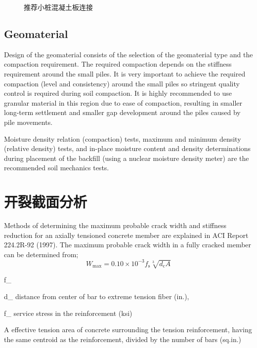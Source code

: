 \begin{figure}
  \caption{推荐小桩混凝土板连接}
  \label{fig:pile-slab-connection}
\end{figure}

\subsection{Geomaterial}

Design of the geomaterial consists of the selection of the geomaterial type and the compaction requirement. The required compaction depends on the stiffness requirement around the small piles. It is very important to achieve the required compaction (level and consistency) around the small piles so stringent quality control is required during soil compaction. It is highly recommended to use granular material in this region due to ease of compaction, resulting in smaller long-term settlement and smaller gap development around the piles caused by pile movements.

Moisture density relation (compaction) tests, maximum and minimum density (relative density) tests, and in-place moisture content and density determinations during placement of the backfill (using a nuclear moisture density meter) are the recommended soil mechanics tests.

\section{开裂截面分析}
Methods of determining the maximum probable crack width and stiffness reduction for an axially tensioned concrete member are explained in ACI Report 224.2R-92 (1997). The maximum probable crack width in a fully cracked member can be determined from;
\begin{equation}
  \label{eq:maximum-crack}
  W_\text{max} =0.10\times 10^{-3} f_\text{s} \sqrt[3]{d_\text{c} A}
\end{equation}
\begin{EqDesc}{f_}
  \item [d_\text{c}] distance from center of bar to extreme tension fiber (in.),
  \item [f_\text{s}] service stress in the reinforcement (ksi)
  \item [A] effective tension area of concrete surrounding the tension reinforcement, having the same centroid as the reinforcement, divided by the number of bars (sq.in.)
\end{EqDesc}

